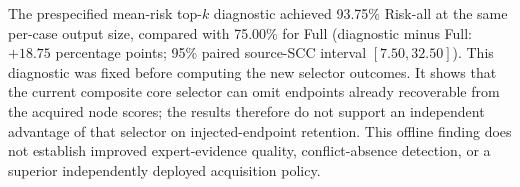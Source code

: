 The prespecified mean-risk top-$k$ diagnostic achieved 93.75\% Risk-all at the same per-case output size, compared with 75.00\% for Full (diagnostic minus Full: $+18.75$ percentage points; 95\% paired source-SCC interval $[7.50,32.50]$). This diagnostic was fixed before computing the new selector outcomes. It shows that the current composite core selector can omit endpoints already recoverable from the acquired node scores; the results therefore do not support an independent advantage of that selector on injected-endpoint retention. This offline finding does not establish improved expert-evidence quality, conflict-absence detection, or a superior independently deployed acquisition policy.
